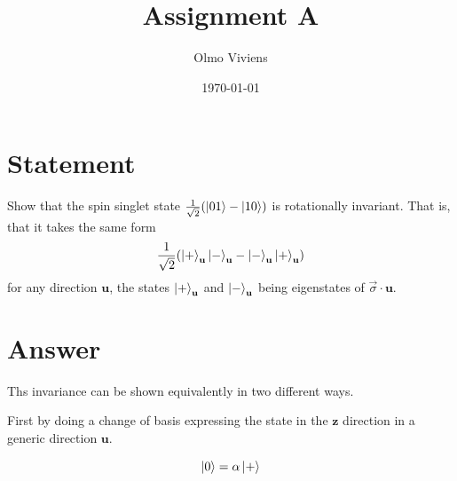 \documentclass[a4paper]{article}
\title{Assignment A}
\author{Olmo Viviens}
\date{\today}
\begin{document}
\maketitle
\section*{Statement}
Show that the spin singlet state \(\frac{1}{\sqrt{2}} (\ket{01} - \ket{10})\) is rotationally invariant. That is, that it takes the same form
\[
    \frac{1}{\sqrt{2}}(\ket{+}_\mathbf{u}\ket{-}_\mathbf{u}-\ket{-}_\mathbf{u}\ket{+}_\mathbf{u})
\]
for any direction \(\mathbf{u}\), the states \(\ket{+}_\mathbf{u}\) and \(\ket{-}_\mathbf{u}\) being eigenstates of \(\vec{\sigma} \cdot \mathbf{u}\).
\section*{Answer}
Ths invariance can be shown equivalently in two different ways.

First by doing a change of basis expressing the state in the \(\mathbf{z}\) direction in a generic direction \(\mathbf{u}\).

\[
    \ket{0} = \alpha \ket{+}
\]
\end{document}
